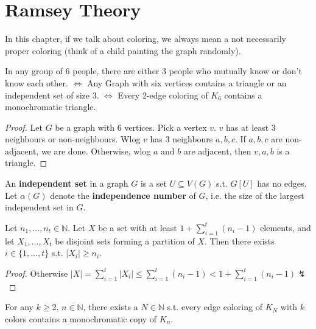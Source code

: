 \section{Ramsey Theory}
In this chapter, if we talk about coloring, we always mean a not necessarily proper coloring (think of a child painting the graph randomly).\\
\begin{example}\label{6.1}
    In any group of 6 people, there are either 3 people who mutually know or don't know each other. $\iff$ Any Graph with six vertices contains a triangle or an independent set of size 3. $\iff$ Every $2$-edge coloring of $K_6$ contains a monochromatic triangle.
\end{example}
\begin{proof}
    Let $G$ be a graph with 6 vertices. Pick a vertex $v$. $v$ has at least 3 neighbours or non-neighbours. Wlog $v$ has 3 neighbours $a,b,c$. If $a,b,c$ are non-adjacent, we are done. Otherwise, wlog $a$ and $b$ are adjacent, then $v,a,b$ is a triangle.
\end{proof}
\begin{definition}\label{6.2}
    An \textbf{independent set} in a graph $G$ is a set $U\subseteq V(G)$ s.t. $G[U]$ has no edges. Let $\alpha(G)$ denote the \textbf{independence number} of $G$, i.e. the size of the largest independent set in $G$.
\end{definition}
\begin{theorem}\label{6.3}
    Let $n_1,...,n_t\in\mathbb{N}$. Let $X$ be a set with at least $1+\sum\limits_{i=1}^t (n_i-1)$ elements, and let $X_1,...,X_t$ be disjoint sets forming a partition of $X$. Then there exists $i\in\{1,...,t\}$ s.t. $|X_i|\geq n_i$.
\end{theorem}
\begin{proof}
    Otherwise $|X|=\sum\limits_{i=1}^t |X_i|\leq \sum\limits_{i=1}^t (n_i-1) < 1+\sum\limits_{i=1}^t (n_i-1)\lightning$
\end{proof}
\begin{theorem}\label{6.4}
    For any $k\geq 2$, $n\in\mathbb{N}$, there exists a $N\in\mathbb{N}$ s.t. every edge coloring of $K_N$ with $k$ colors contains a monochromatic copy of $K_n$.
\end{theorem}
